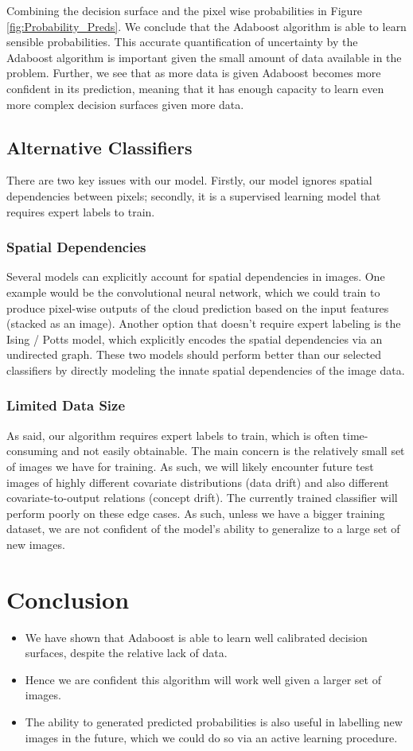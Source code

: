 \documentclass[11pt, letterpaper, journal]{IEEEtran}
\begin{document}
Combining the decision surface and the pixel wise probabilities in Figure \ref{fig:Probability_Preds}. We conclude that the Adaboost algorithm is able to learn sensible probabilities. This accurate quantification of uncertainty by the Adaboost algorithm is important given the small amount of data available in the problem. Further, we see that as more data is given Adaboost becomes more confident in its prediction, meaning that it has enough capacity to learn even more complex decision surfaces given more data. 


\subsection{Alternative Classifiers}
There are two key issues with our model. Firstly, our model ignores spatial dependencies between pixels; secondly, it is a supervised learning model that requires expert labels to train.
\subsubsection{Spatial Dependencies}
Several models can explicitly account for spatial dependencies in images. One example would be the convolutional neural network, which we could train to produce pixel-wise outputs of the cloud prediction based on the input features (stacked as an image). Another option that doesn't require expert labeling is the Ising / Potts model, which explicitly encodes the spatial dependencies via an undirected graph. These two models should perform better than our selected classifiers by directly modeling the innate spatial dependencies of the image data.
\subsubsection{Limited Data Size}
As said, our algorithm requires expert labels to train, which is often time-consuming and not easily obtainable. The main concern is the relatively small set of images we have for training. As such, we will likely encounter future test images of highly different covariate distributions (data drift) and also different covariate-to-output relations (concept drift). The currently trained classifier will perform poorly on these edge cases. As such, unless we have a bigger training dataset, we are not confident of the model's ability to generalize to a large set of new images. 

\section{Conclusion}
\begin{itemize}
    \item We have shown that Adaboost is able to learn well calibrated decision surfaces, despite the relative lack of data.
    \item Hence we are confident this algorithm will work well given a larger set of images.
    \item The ability to generated predicted probabilities is also useful in labelling new images in the future, which we could do so via an active learning procedure.
\end{itemize}
\end{document}
